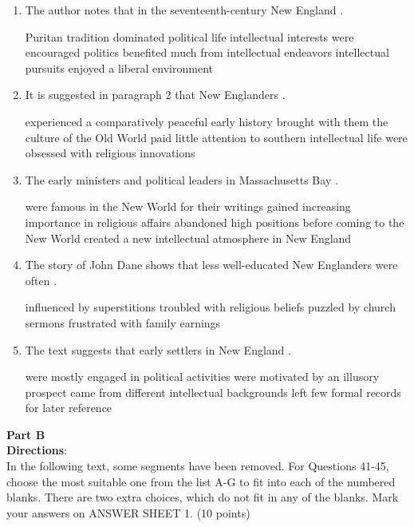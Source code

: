 \begin{enumerate}[resume]
	\item
 The author notes that in the seventeenth-century New
England \lineread.


\fourchoices
{Puritan tradition dominated political life}
{intellectual interests were encouraged}
{politics benefited much from intellectual endeavors}
{intellectual pursuits enjoyed a liberal environment}



\item
 It is suggested in paragraph 2 that New
Englanders \lineread.


\fourchoices
{experienced a comparatively peaceful early history}
{brought with them the culture of the Old World}
{paid little attention to southern intellectual life}
{were obsessed with religious innovations}



\item
The early ministers and political leaders in Massachusetts
Bay \lineread.


\fourchoices
{were famous in the New World for their writings}
{gained increasing importance in religious affairs}
{abandoned high positions before coming to the New World}
{created a new intellectual atmosphere in New England}



\item
The story of John Dane shows that less well-educated New
Englanders were often \lineread.


\fourchoices
{influenced by superstitions}
{troubled with religious beliefs}
{puzzled by church sermons}
{frustrated with family earnings}


\item
The text suggests that early settlers in New
England \lineread.


\fourchoices
{were mostly engaged in political activities}
{were motivated by an illusory prospect}
{came from different intellectual backgrounds}
{left few formal records for later reference}


\end{enumerate}


\newpage
\noindent
\textbf{Part B}\\
\textbf{Directions}:\\
In the following text, some segments have been removed. For Questions
41-45, choose the most suitable one from the list A-G to fit into each
of the numbered blanks. There are two extra choices, which do not fit in
any of the blanks. Mark your answers on ANSWER SHEET 1. (10 points)



